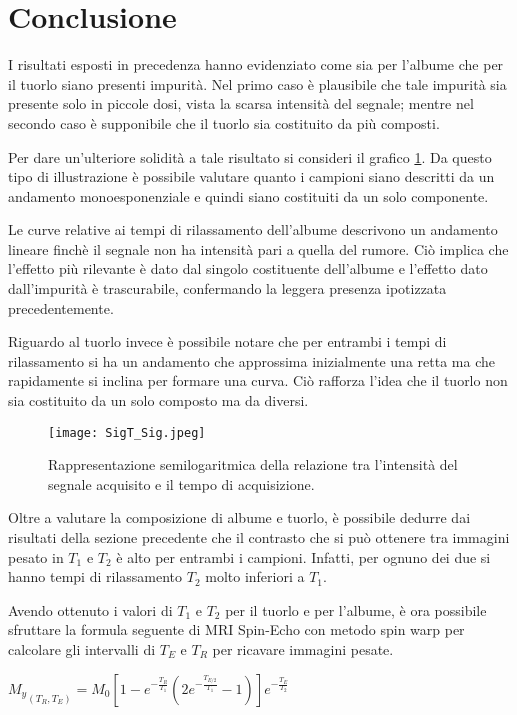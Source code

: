 \section*{Conclusione}
I risultati esposti in precedenza hanno evidenziato come sia per l'albume che per il tuorlo siano presenti impurità.
Nel primo caso è plausibile che tale impurità sia presente solo in piccole dosi, vista la scarsa intensità del segnale; mentre nel secondo caso è supponibile che il tuorlo sia costituito da più composti.

Per dare un'ulteriore solidità a tale risultato si consideri il grafico \ref{fig:SigT_Sig}. 
Da questo tipo di illustrazione è possibile valutare quanto i campioni siano descritti da un andamento monoesponenziale e quindi siano costituiti da un solo componente.

Le curve relative ai tempi di rilassamento dell'albume descrivono un andamento lineare finchè il segnale non ha intensità pari a quella del rumore. 
Ciò implica che l'effetto più rilevante è dato dal singolo costituente dell'albume e l'effetto dato dall'impurità è trascurabile, confermando la leggera presenza ipotizzata precedentemente.

Riguardo al tuorlo invece è possibile notare che per entrambi i tempi di rilassamento si ha un andamento che approssima inizialmente una retta ma che rapidamente si inclina per formare una curva.
Ciò rafforza l'idea che il tuorlo non sia costituito da un solo composto ma da diversi.

\begin{figure}[h]
\centering
\texttt{[image: SigT\_Sig.jpeg]}
\caption{Rappresentazione semilogaritmica della relazione tra l'intensità del segnale acquisito e il tempo di acquisizione.}
\label{fig:SigT_Sig}
\end{figure}


Oltre a valutare la composizione di albume e tuorlo, è possibile dedurre dai risultati della sezione precedente che il contrasto che si può ottenere tra immagini pesato in $T_1$ e $T_2$ è alto per entrambi i campioni.
Infatti, per ognuno dei due si hanno tempi di rilassamento $T_2$ molto inferiori a $T_1$.

Avendo ottenuto i valori di $T_1$ e $T_2$ per il tuorlo e per l'albume, è ora possibile sfruttare la formula seguente di MRI Spin-Echo con metodo spin warp per calcolare gli intervalli di $T_E$ e $T_R$ per ricavare immagini pesate.

${M_y}_{(T_R,T_E)} = M_0[1-e^{-\frac{T_R}{T_1}}(2e^{-\frac{T_{E/2}}{T_1}}-1)]e^{-\frac{T_E}{T_2}}$		\\
	

